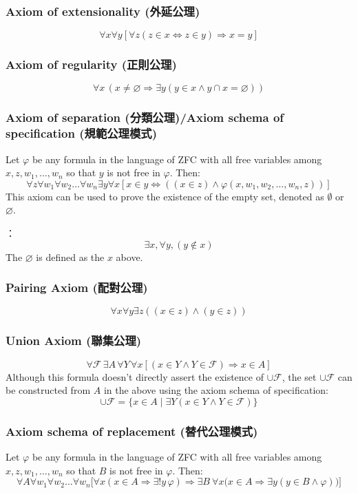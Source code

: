 \documentclass[a4paper,12pt]{report}
\begin{document}
\subsubsection{Axiom of extensionality (外延公理)}
\[\forall x\forall y[\forall z(z\in x\Leftrightarrow z\in y)\Rightarrow x=y]\]
\subsubsection{Axiom of regularity (正則公理)}
\[\forall x\,(x\neq \varnothing \Rightarrow \exists y(y\in x\land y\cap x=\varnothing ))\]
\subsubsection{Axiom of separation (分類公理)/Axiom schema of specification (規範公理模式)}
Let $\varphi$ be any formula in the language of ZFC with all free variables among $x,z,w_{1},\ldots ,w_{n}$ so that $y$ is not free in 
$\varphi$. Then:
\[\forall z\forall w_{1}\forall w_{2}\ldots \forall w_{n}\exists y\forall x[x\in y\Leftrightarrow ((x\in z)\land \varphi (x,w_{1},w_{2},...,w_{n},z))]\]
This axiom can be used to prove the existence of the empty set, denoted as $\emptyset$ or $\varnothing$.

：
\[\exists x , \forall y , (y \notin x) \]
The $\varnothing$ is defined as the $x$ above.
\subsubsection{Pairing Axiom (配對公理)}
\[ \forall x\forall y\exists z((x\in z)\land (y\in z))\]
\subsubsection{Union Axiom (聯集公理)}
\[ \forall {\mathcal {F}}\,\exists A\,\forall Y\,\forall x[(x\in Y\land Y\in {\mathcal {F}})\Rightarrow x\in A]\]
Although this formula doesn't directly assert the existence of $\cup \mathcal {F}$, the set $\cup \mathcal {F}$ can be constructed from $A$ in the above using the axiom schema of specification:
\[\cup \mathcal {F}=\{x\in A\mid\exists Y(x\in Y\land Y\in {\mathcal {F}})\}\]
\subsubsection{Axiom schema of replacement (替代公理模式)}
Let $\varphi$ be any formula in the language of ZFC with all free variables among $x,z,w_{1},\ldots ,w_{n}$ so that $B$ is not free in 
$\varphi$. Then:
\[ \forall A\forall w_{1}\forall w_{2}\ldots \forall w_{n}{\bigl [}\forall x(x\in A\Rightarrow \exists !y\,\varphi )\Rightarrow \exists B\ \forall x{\bigl (}x\in A\Rightarrow \exists y(y\in B\land \varphi ){\bigr )}{\bigr ]}\]
\end{document}
